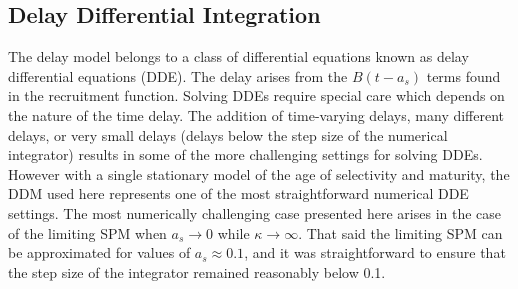 %
%
%

%
\subsection{Delay Differential Integration}

%
The delay model belongs to a class of differential equations known as delay
differential equations (DDE). The delay arises from the $B(t-a_s)$ terms
found in the recruitment function. Solving DDEs require special care which
depends on the nature of the time delay. The addition of time-varying delays,
many different delays, or very small delays (delays below the step size of the
numerical integrator) results in some of the more challenging settings for
solving DDEs. However with a single stationary model of the age of selectivity and maturity,
the DDM used here represents one of the most straightforward numerical 
DDE settings. The most numerically challenging case presented here arises
in the case of the limiting SPM when $a_s\to0$ while $\kappa\to\infty$.
That said the limiting SPM can be approximated for values of
$a_s\approx0.1$, and it was straightforward to ensure that the step size of
the integrator remained reasonably below 0.1.

